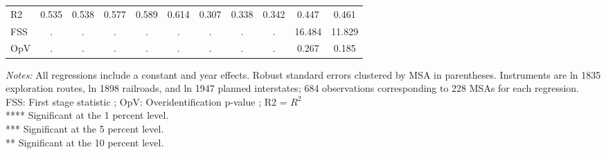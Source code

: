 \begin{table}[htbp]
\begin{tabular}{l*{10}{c}}
R2                  &       0.535         &       0.538         &       0.577         &       0.589         &       0.614         &       0.307         &       0.338         &       0.342         &       0.447         &       0.461         \\
FSS                 &           .         &           .         &           .         &           .         &           .         &           .         &           .         &           .         &      16.484         &      11.829         \\
OpV                 &           .         &           .         &           .         &           .         &           .         &           .         &           .         &           .         &       0.267         &       0.185         \\
\hline\hline
\end{tabular}
\begin{flushleft}
\emph{Notes:} All regressions include a constant and year effects. Robust standard errors clustered by MSA in parentheses. Instruments are ln 1835 exploration routes, ln 1898 railroads, and ln 1947 planned interstates; 684 observations corresponding to 228 MSAs for each regression. \\ FSS: First stage statistic ; OpV: Overidentification p-value ; R2 = $ R^{2} $ \\         **** Significant at the 1 percent level. \\         *** Significant at the 5 percent level. \\         ** Significant at the 10 percent level.
\end{flushleft}
\end{table}
